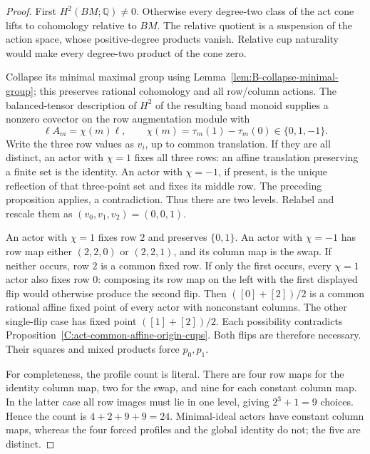 \begin{proof}
First $H^2(BM;\mathbb Q)\ne0$.  Otherwise every degree-two
class of the act cone lifts to cohomology relative to $BM$.
The relative quotient is a suspension of the action space,
whose positive-degree products vanish.  Relative cup naturality
would make every degree-two product of the cone zero.

Collapse its minimal maximal group using
Lemma~\ref{lem:B-collapse-minimal-group}; this preserves rational
cohomology and all row/column actions.  The balanced-tensor
description of $H^2$ of the resulting band monoid supplies
a nonzero covector on the row augmentation module with
\[
 \ell A_m=\chi(m)\ell,\qquad
 \chi(m)=\tau_m(1)-\tau_m(0)\in\{0,1,-1\}.
\]
Write the three row values as $v_i$, up to common translation.
If they are all distinct, an actor with $\chi=1$ fixes all three
rows: an affine translation preserving a finite set is the
identity.  An actor with $\chi=-1$, if present, is the unique
reflection of that three-point set and fixes its middle row.
The preceding proposition applies, a contradiction.
Thus there are two levels.  Relabel and rescale them as
$(v_0,v_1,v_2)=(0,0,1)$.

An actor with $\chi=1$ fixes row $2$ and preserves $\{0,1\}$.
An actor with $\chi=-1$ has row map either $(2,2,0)$ or
$(2,2,1)$, and its column map is the swap.  If neither occurs,
row $2$ is a common fixed row.  If only the first occurs,
every $\chi=1$ actor also fixes row $0$: composing its row map
on the left with the first displayed flip would otherwise
produce the second flip.  Then
$( [0]+[2])/2$ is a common rational affine fixed point of every
actor with nonconstant columns.  The other single-flip case
has fixed point $( [1]+[2])/2$.  Each possibility contradicts
Proposition~\ref{C:act-common-affine-origin-cups}.
Both flips are therefore necessary.  Their squares and mixed
products force $p_0,p_1$.

For completeness, the profile count is literal.  There are four
row maps for the identity column map, two for the swap, and
nine for each constant column map.  In the latter case all row
images must lie in one level, giving $2^3+1=9$ choices.
Hence the count is $4+2+9+9=24$.
Minimal-ideal actors have constant column maps, whereas the four forced
profiles and the global identity do not; the five are distinct.
\end{proof}

